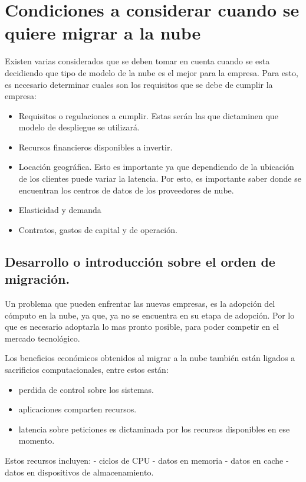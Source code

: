 \documentclass[12pt,twoside]{reedthesis}
\providecommand{\tightlist}{%
  \setlength{\itemsep}{0pt}\setlength{\parskip}{0pt}}
\theoremstyle{definition}
\theoremstyle{definition}
\theoremstyle{definition}
\theoremstyle{remark}
\begin{document}
\hypertarget{condiciones-a-considerar-cuando-se-quiere-migrar-a-la-nube}{%
\section{Condiciones a considerar cuando se quiere migrar a la
nube}\label{condiciones-a-considerar-cuando-se-quiere-migrar-a-la-nube}}

Existen varias considerados que se deben tomar en cuenta cuando se esta
decidiendo que tipo de modelo de la nube es el mejor para la empresa.
Para esto, es necesario determinar cuales son los requisitos que se debe
de cumplir la empresa:
\begin{itemize}
\tightlist
\item
  Requisitos o regulaciones a cumplir. Estas serán las que dictaminen
  que modelo de despliegue se utilizará.
\item
  Recursos financieros disponibles a invertir.
\item
  Locación geográfica. Esto es importante ya que dependiendo de la
  ubicación de los clientes puede variar la latencia. Por esto, es
  importante saber donde se encuentran los centros de datos de los
  proveedores de nube.
\item
  Elasticidad y demanda
\item
  Contratos, gastos de capital y de operación.
\end{itemize}
\hypertarget{desarrollo-o-introduccion-sobre-el-orden-de-migracion.}{%
\subsection{Desarrollo o introducción sobre el orden de
migración.}\label{desarrollo-o-introduccion-sobre-el-orden-de-migracion.}}

Un problema que pueden enfrentar las nuevas empresas, es la adopción del
cómputo en la nube, ya que, ya no se encuentra en su etapa de adopción.
Por lo que es necesario adoptarla lo mas pronto posible, para poder
competir en el mercado tecnológico.

Los beneficios económicos obtenidos al migrar a la nube también están
ligados a sacrificios computacionales, entre estos están:
\begin{itemize}
\tightlist
\item
  perdida de control sobre los sistemas.
\item
  aplicaciones comparten recursos.
\item
  latencia sobre peticiones es dictaminada por los recursos disponibles
  en ese momento.
\end{itemize}
Estos recursos incluyen: - ciclos de CPU - datos en memoria - datos en
cache - datos en dispositivos de almacenamiento.
\end{document}
